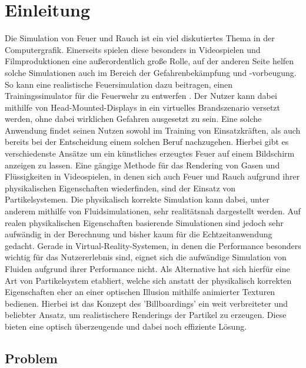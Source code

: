\section{Einleitung}
\noindent

Die Simulation von Feuer und Rauch ist ein viel diskutiertes Thema in der Computergrafik. Einerseits
spielen diese besonders in Videospielen und Filmproduktionen eine außerordentlich große Rolle, auf der
anderen Seite helfen solche Simulationen auch im Bereich der Gefahrenbekämpfung und -vorbeugung.
So kann eine realistische Feuersimulation dazu beitragen, einen Trainingssimulator für die Feuerwehr zu
entwerfen \parencite{Schlager2017}. Der Nutzer kann dabei mithilfe von Head-Mounted-Displays in ein virtuelles Brandszenario versetzt werden,
ohne dabei wirklichen Gefahren ausgesetzt zu sein. Eine solche Anwendung findet seinen Nutzen sowohl im Training
von Einsatzkräften, als auch bereits bei der Entscheidung einem solchen Beruf nachzugehen.
Hierbei gibt es verschiedenste Ansätze um ein künstliches erzeugtes Feuer auf einem
Bildschirm anzeigen zu lassen. Eine gängige Methode für das Rendering von Gasen und Flüssigkeiten
in Videospielen, in denen sich auch Feuer und Rauch aufgrund ihrer physikalischen Eigenschaften
wiederfinden, sind der Einsatz von Partikelsystemen. Die physikalisch korrekte Simulation kann dabei,
unter anderem mithilfe von Fluidsimulationen, sehr realitätsnah dargestellt werden.
Auf realen physikalischen Eigenschaften basierende Simulationen sind jedoch sehr aufwändig in der
Berechnung und bisher kaum für die Echtzeitanwendung gedacht.
Gerade in Virtual-Reality-Systemen, in denen die Performance besonders wichtig für das Nutzererlebnis sind,
eignet sich die aufwändige Simulation von Fluiden aufgrund ihrer Performance nicht. Als Alternative hat
sich hierfür eine Art von Partikelsystem etabliert, welche sich anstatt der physikalisch korrekten
Eigenschaften eher an einer optischen Illusion mithilfe animierter Texturen bedienen.
Hierbei ist das Konzept des 'Billboardings' ein weit verbreiteter und beliebter Ansatz,
um realistischere Renderings der Partikel zu erzeugen. Diese bieten eine optisch überzeugende und
dabei noch effiziente Lösung.



\subsection{Problem}


